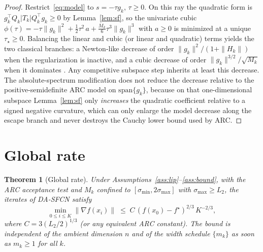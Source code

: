 \documentclass[11pt,a4paper]{article}
\newtheorem{theorem}{Theorem}
\theoremstyle{definition}
\begin{document}
\begin{proof}
Restrict~\eqref{eq:model} to $s=-\tau g_k$, $\tau\ge 0$. On this ray the
quadratic form is $g_k^\top Q_k|T_k|Q_k^\top g_k\ge 0$ by Lemma~\ref{lem:sf},
so the univariate cubic
$\phi(\tau)=-\tau\|g_k\|^2+\tfrac12\tau^2\,a+\tfrac{M_k}{6}\tau^3\|g_k\|^3$
with $a\ge 0$ is minimized at a unique $\tau_\star\ge 0$. Balancing the
linear and cubic (or linear and quadratic) terms yields the two classical
branches: a Newton-like decrease of order $\|g_k\|^2/(1+\|H_k\|)$ when the
regularization is inactive, and a cubic decrease of order
$\|g_k\|^{3/2}/\sqrt{M_k}$ when it dominates
\cite{nesterov2006,cartis2011}.
Any competitive subspace step inherits at least this decrease.
The absolute-spectrum modification does not reduce the decrease relative
to the positive-semidefinite ARC model on $\mathrm{span}\{g_k\}$, because
on that one-dimensional subspace Lemma~\ref{lem:sf} only \emph{increases}
the quadratic coefficient relative to a signed negative curvature, which
can only enlarge the model decrease along the escape branch and never
destroys the Cauchy lower bound used by ARC.
\end{proof}

\section{Global rate}
\begin{theorem}[Global rate]\label{thm:global}
Under Assumptions~\ref{ass:lip}--\ref{ass:bound}, with the ARC acceptance
test and $M_k$ confined to $[\sigma_{\min},2\sigma_{\max}]$ with
$\sigma_{\max}\ge L_2$, the iterates of DA-SFCN satisfy
\[
\min_{0\le i\le K}\|\nabla f(x_i)\|
\;\le\;
C\,(f(x_0)-f^\star)^{2/3}\,K^{-2/3},
\]
where $C=3(L_2/2)^{1/3}$ (or any equivalent ARC constant). The bound is
independent of the ambient dimension $n$ and of the width schedule
$\{m_k\}$ as soon as $m_k\ge 1$ for all $k$.
\end{theorem}
\end{document}
